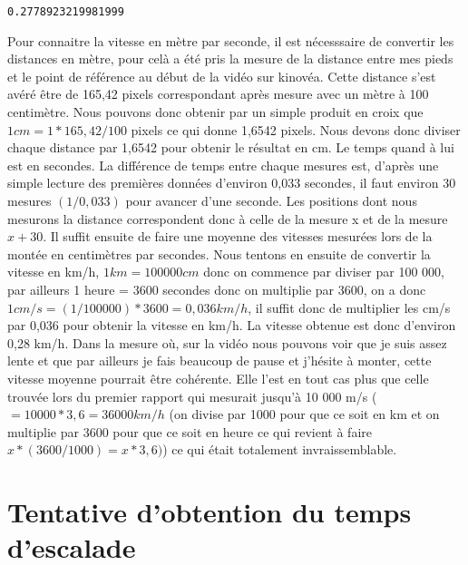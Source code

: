 \documentclass[11pt]{article}
\begin{document}
\label{orge7125cd}
\begin{verbatim}
0.2778923219981999
\end{verbatim}


Pour connaitre la vitesse en mètre par seconde, il est nécesssaire de convertir les distances en mètre, pour celà a été pris la mesure de la distance
entre mes pieds et le point de référence au début de la vidéo sur kinovéa. Cette distance s'est avéré être de 165,42 pixels correspondant après mesure
avec un mètre à 100 centimètre. Nous pouvons donc obtenir par un simple produit en croix que \(1 cm = 1 * 165,42/100\) pixels ce qui donne 1,6542
pixels. Nous devons donc diviser chaque distance par 1,6542 pour obtenir le résultat en cm. Le temps quand à lui est en secondes. La différence de
temps entre chaque mesures est, d'après une simple lecture des premières données d'environ 0,033 secondes, il faut environ 30 mesures \((1/0,033)\)
pour avancer d'une seconde. Les positions dont nous mesurons la distance correspondent donc à celle de la mesure x et de la mesure \(x+30\). Il suffit
ensuite de faire une moyenne des vitesses mesurées lors de la montée en centimètres par secondes. Nous tentons en ensuite de convertir la vitesse en
km/h, \(1 km = 100 000 cm\) donc on commence par diviser par 100 000, par ailleurs 1 heure = 3600 secondes donc on multiplie par 3600, on a donc
\(1 cm/s = (1/100 000)*3600 = 0,036 km/h\), il suffit donc de multiplier les cm/s par 0,036 pour obtenir la vitesse en km/h. La vitesse obtenue est donc
d'environ 0,28 km/h. Dans la mesure où, sur la vidéo nous pouvons voir que je suis assez lente et que par ailleurs je fais beaucoup de pause et
j'hésite à monter, cette vitesse moyenne pourrait être cohérente. Elle l'est en tout cas plus que celle trouvée lors du premier rapport qui mesurait
jusqu'à 10 000 m/s (\(= 10 000*3,6 = 36 000 km/h\) (on divise par 1000 pour que ce soit en km et on multiplie par 3600 pour que ce soit en heure ce qui
revient à faire \(x*(3600/1000)=x*3,6)\)) ce qui était totalement invraissemblable.

\begin{center}

\end{center}
\section{Tentative d'obtention du temps d'escalade}
\label{sec:org63167ef}
\end{document}

